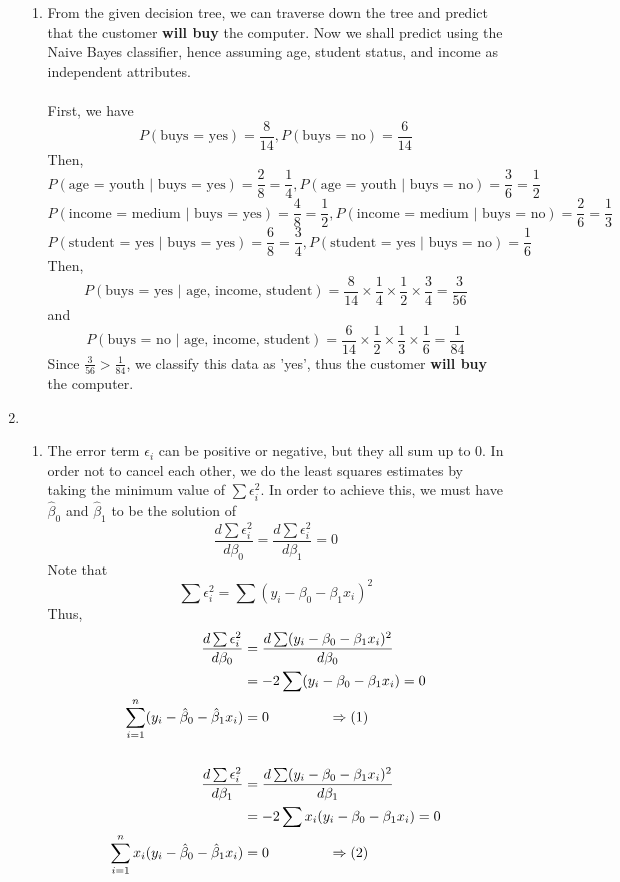\documentclass{article}
\begin{document}
\begin{enumerate}
\begin{enumerate}
        \item From the given decision tree, we can traverse down the tree and predict that the customer \textbf{will buy} the computer. Now we shall predict using the Naive Bayes classifier, hence assuming age, student status, and income as independent attributes.\\\\
        First, we have
        \[P(\text{buys = yes})=\frac{8}{14},P(\text{buys = no})=\frac{6}{14}\]
        Then,
        \[P(\text{age = youth }\vert\text{ buys = yes})=\frac{2}{8}=\frac{1}{4},P(\text{age = youth }\vert\text{ buys = no})=\frac{3}{6}=\frac{1}{2}\]
        \[P(\text{income = medium }\vert\text{ buys = yes})=\frac{4}{8}=\frac{1}{2},P(\text{income = medium }\vert\text{ buys = no})=\frac{2}{6}=\frac{1}{3}\]
        \[P(\text{student = yes }\vert\text{ buys = yes})=\frac{6}{8}=\frac{3}{4},P(\text{student = yes }\vert\text{ buys = no})=\frac{1}{6}\]
        Then,
        \[P(\text{buys = yes }\vert\text{ age, income, student})=\frac{8}{14}\times\frac{1}{4}\times\frac{1}{2}\times\frac{3}{4}=\frac{3}{56}\]
        and
        \[P(\text{buys = no }\vert\text{ age, income, student})=\frac{6}{14}\times\frac{1}{2}\times\frac{1}{3}\times\frac{1}{6}=\frac{1}{84}\]
        Since $\frac{3}{56} > \frac{1}{84}$, we classify this data as 'yes', thus the customer \textbf{will buy} the computer.
    \end{enumerate}
    
    \item
    \begin{enumerate}
        \item The error term $\epsilon_i$ can be positive or negative, but they all sum up to 0. In order not to cancel each other, we do the least squares estimates by taking the minimum value of $\sum \epsilon_i^2$. In order to achieve this, we must have $\hat{\beta}_0$ and $\hat{\beta}_1$ to be the solution of
        \[\frac{d\sum \epsilon_i^2}{d\beta_0}=\frac{d\sum \epsilon_i^2}{d\beta_1}=0\]
        Note that
        \[\sum \epsilon_i^2=\sum (y_i-\beta_0 - \beta_1x_i)^2\]
        Thus,
        \begin{align*}
            \frac{d\sum \epsilon_i^2}{d\beta_0} &= \frac{d\sum (y_i-\beta_0 - \beta_1x_i)^2}{d\beta_0}\\
            &= -2\sum (y_i-\beta_0-\beta_1x_i) = 0\\
            \sum_{i=1}^{n} (y_i-\hat{\beta}_0-\hat{\beta}_1x_i) &= 0 \hspace{1.5 cm}\Rightarrow (1)\\\\
            \frac{d\sum \epsilon_i^2}{d\beta_1} &= \frac{d\sum (y_i-\beta_0 - \beta_1x_i)^2}{d\beta_1}\\
            &= -2\sum x_i(y_i-\beta_0-\beta_1x_i) = 0\\
            \sum_{i=1}^{n} x_i(y_i-\hat{\beta}_0-\hat{\beta}_1x_i) &= 0 \hspace{1.5 cm}\Rightarrow (2)
        \end{align*}
        

\end{enumerate}
\end{enumerate}
\end{document}

